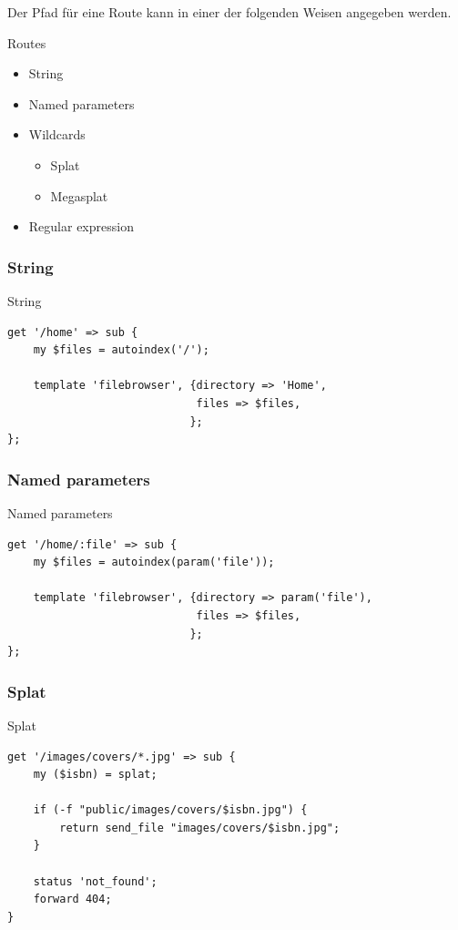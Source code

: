 Der Pfad für eine Route kann in einer der folgenden
Weisen angegeben werden.

\begin{frame}{Routes}
\begin{itemize}
\item String
\item Named parameters
\item Wildcards 
\begin{itemize}
\item Splat
\item Megasplat
\end{itemize}
\item Regular expression
\end{itemize}
\end{frame}

\subsubsection{String}
\begin{frame}[fragile]{String}
\begin{lstlisting}
get '/home' => sub {
    my $files = autoindex('/');

    template 'filebrowser', {directory => 'Home',
                             files => $files,
                            };
};
\end{lstlisting}
\end{frame}

\subsubsection{Named parameters}
\begin{frame}[fragile]{Named parameters}
\begin{lstlisting}
get '/home/:file' => sub {
    my $files = autoindex(param('file'));

    template 'filebrowser', {directory => param('file'),
                             files => $files,
                            };
};
\end{lstlisting}
\end{frame}

\subsubsection{Splat}
\begin{frame}[fragile]{Splat}
\begin{lstlisting}
get '/images/covers/*.jpg' => sub {
    my ($isbn) = splat;

    if (-f "public/images/covers/$isbn.jpg") {
        return send_file "images/covers/$isbn.jpg";
    }

    status 'not_found';
    forward 404;
}
\end{lstlisting}
\end{frame}

